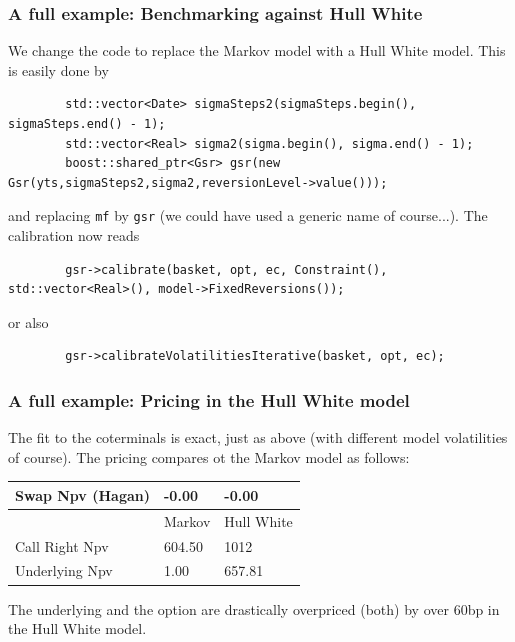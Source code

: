 \documentclass{beamer}
\begin{document}
\begin{frame}[fragile]
\frametitle{A full example: Benchmarking against Hull White}
We change the code to replace the Markov model with a Hull White model. This is easily done by
\begin{verbatim}
        std::vector<Date> sigmaSteps2(sigmaSteps.begin(), sigmaSteps.end() - 1);
        std::vector<Real> sigma2(sigma.begin(), sigma.end() - 1);
        boost::shared_ptr<Gsr> gsr(new Gsr(yts,sigmaSteps2,sigma2,reversionLevel->value()));
\end{verbatim}
and replacing \verb+mf+ by \verb+gsr+ (we could have used a generic name of course...). The calibration now reads
\begin{verbatim}
        gsr->calibrate(basket, opt, ec, Constraint(), std::vector<Real>(), model->FixedReversions());
\end{verbatim}
or also
\begin{verbatim}
        gsr->calibrateVolatilitiesIterative(basket, opt, ec);
\end{verbatim}

\end{frame}


\begin{frame}[fragile]
\frametitle{A full example: Pricing in the Hull White model}

The fit to the coterminals is exact, just as above (with different model volatilities of course).
The pricing compares ot the Markov model as follows:
\begin{table}[ht]
\begin{tabular}{l|l|l}
Swap Npv (Hagan) & -0.00 & -0.00\\ \hline
 & Markov & Hull White \\ \hline
Call Right Npv   & 604.50 & 1012\\
Underlying Npv   & 1.00 & 657.81\\
\end{tabular}
\end{table}

The underlying and the option are drastically overpriced (both)  by over $60$bp in the Hull White model.
\end{frame}
\end{document}
